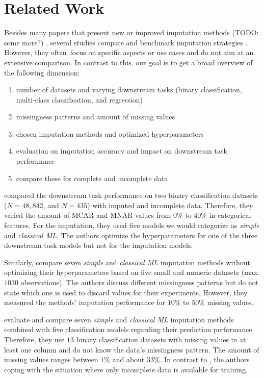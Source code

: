 \section{Related Work}

Besides many papers that present new or improved imputation methods (TODO: some more?) \citep{Imputation_Benchmark_4, Imputation_Benchmark_6}, several studies compare and benchmark imputation strategies \citep{Imputation_Benchmark_1, Imputation_Benchmark_2, Imputation_Benchmark_3}. However, they often focus on specific aspects or use cases and do not aim at an extensive comparison. In contrast to this, our goal is to get a broad overview of the following  dimension:
%
\begin{enumerate}
	\item number of datasets and varying downstream tasks (binary classification, multi-class classification, and regression)
	\item missingness patterns and amount of missing values
	\item chosen imputation methods and optimized hyperparameters
	\item evaluation on imputation accuracy and impact on downstream task performance
	\item compare these for complete and incomplete data
\end{enumerate}

\cite{Imputation_Benchmark_3} compared the downstream task performance on two binary classification datasets ($N = 48,842$, and $N = 435$) with imputed and incomplete data. Therefore, they varied the amount of MCAR and MNAR values from $0\%$ to $40\%$ in categorical features. For the imputation, they used five models we would categorize as \emph{simple} and \emph{classical ML}. The authors optimize the hyperparameters for one of the three downstream task models but not for the imputation models.

Similarly, \cite{Imputation_Benchmark_2} compare seven \emph{simple} and \emph{classical ML} imputation methods without optimizing their hyperparameters based on five small and numeric datasets (max. $1030$ observations). The authors discuss different missingness patterns but do not state which one is used to discard values for their experiments. However, they measured the methods' imputation performance for $10\%$ to $50\%$ missing values.

\cite{Imputation_Benchmark_1} evaluate and compare seven \emph{simple} and \emph{classical ML} imputation methods combined with five classification models regarding their prediction performance. Therefore,  they use $13$ binary classification datasets with missing values in at least one column and do not know the data's missingness pattern. The amount of missing values ranges between $1\%$ and about $33\%$. In contrast to \citep{Imputation_Benchmark_3, Imputation_Benchmark_2}, the authors coping with the situation where only incomplete data is available for training.

